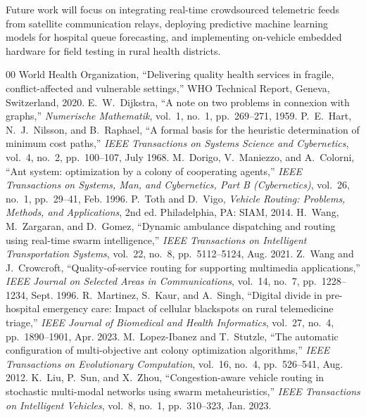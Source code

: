 \documentclass[conference]{IEEEtran}
\begin{document}
Future work will focus on integrating real-time crowdsourced telemetric feeds from satellite communication relays, deploying predictive machine learning models for hospital queue forecasting, and implementing on-vehicle embedded hardware for field testing in rural health districts.

\begin{thebibliography}{00}
 World Health Organization, ``Delivering quality health services in fragile, conflict-affected and vulnerable settings,'' WHO Technical Report, Geneva, Switzerland, 2020.
 E.~W.~Dijkstra, ``A note on two problems in connexion with graphs,'' \textit{Numerische Mathematik}, vol.~1, no.~1, pp.~269--271, 1959.
 P.~E.~Hart, N.~J.~Nilsson, and B.~Raphael, ``A formal basis for the heuristic determination of minimum cost paths,'' \textit{IEEE Transactions on Systems Science and Cybernetics}, vol.~4, no.~2, pp.~100--107, July 1968.
 M.~Dorigo, V.~Maniezzo, and A.~Colorni, ``Ant system: optimization by a colony of cooperating agents,'' \textit{IEEE Transactions on Systems, Man, and Cybernetics, Part B (Cybernetics)}, vol.~26, no.~1, pp.~29--41, Feb. 1996.
 P.~Toth and D.~Vigo, \textit{Vehicle Routing: Problems, Methods, and Applications}, 2nd ed. Philadelphia, PA: SIAM, 2014.
 H.~Wang, M.~Zargaran, and D.~Gomez, ``Dynamic ambulance dispatching and routing using real-time swarm intelligence,'' \textit{IEEE Transactions on Intelligent Transportation Systems}, vol.~22, no.~8, pp.~5112--5124, Aug. 2021.
 Z.~Wang and J.~Crowcroft, ``Quality-of-service routing for supporting multimedia applications,'' \textit{IEEE Journal on Selected Areas in Communications}, vol.~14, no.~7, pp.~1228--1234, Sept. 1996.
 R.~Martinez, S.~Kaur, and A.~Singh, ``Digital divide in pre-hospital emergency care: Impact of cellular blackspots on rural telemedicine triage,'' \textit{IEEE Journal of Biomedical and Health Informatics}, vol.~27, no.~4, pp.~1890--1901, Apr. 2023.
 M.~Lopez-Ibanez and T.~Stutzle, ``The automatic configuration of multi-objective ant colony optimization algorithms,'' \textit{IEEE Transactions on Evolutionary Computation}, vol.~16, no.~4, pp.~526--541, Aug. 2012.
 K.~Liu, P.~Sun, and X.~Zhou, ``Congestion-aware vehicle routing in stochastic multi-modal networks using swarm metaheuristics,'' \textit{IEEE Transactions on Intelligent Vehicles}, vol.~8, no.~1, pp.~310--323, Jan. 2023.
\end{thebibliography}
\end{document}
